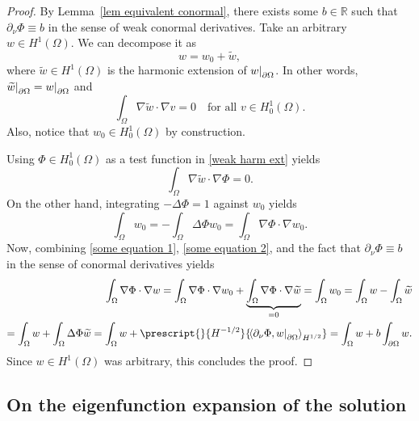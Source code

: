 \documentclass[a4paper,11pt]{article}
\newcommand\restr[2]{{%
\left.\kern-\nulldelimiterspace %
#1 %
\vphantom{|} %
\right|_{#2} %
}}
\newcommand{\Pairing}[2]{
 \prescript{}{{H^{-1/2}}}{\!\left\langle #1, #2\right\rangle_{H^{1/2}}}
 } %
\numberwithin{equation}{section}
\begin{document}
\begin{proof}
By Lemma~\ref{lem equivalent conormal}, there exists some $b\in \mathbb{R}$ such that $\partial_\nu \Phi\equiv b$ in the sense of weak conormal derivatives. Take an arbitrary $w\in H^1(\Omega)$. We can decompose it as
\begin{equation*}
    w=w_0+\widetilde w,
\end{equation*}
where $\widetilde w\in H^1(\Omega)$ is the harmonic extension of $\restr{w}{\partial\Omega}$. In other words, $\restr{\widetilde w}{\partial\Omega}=\restr{w}{\partial\Omega}$ and
\begin{equation}\label{weak harm ext}
   \int_\Omega \nabla \widetilde w \cdot \nabla v =0 \quad \text{for all } v\in H_0^1(\Omega). 
\end{equation}
Also, notice that $w_0\in H_0^1(\Omega)$ by construction.

Using $\Phi\in H_0^1(\Omega)$ as a test function in \eqref{weak harm ext} yields
\begin{equation}\label{some equation 1}
    \int_\Omega \nabla\widetilde w\cdot \nabla \Phi=0.
\end{equation}
On the other hand, integrating $-\Delta\Phi=1$ against $w_0$ yields
\begin{equation}\label{some equation 2}
    \int_\Omega w_0 = -\int_\Omega \Delta \Phi w_0 = \int_\Omega \nabla \Phi\cdot\nabla w_0.
\end{equation} 
Now, combining \eqref{some equation 1}, \eqref{some equation 2}, and the fact that $\partial_\nu \Phi\equiv b$ in the sense of conormal derivatives yields
\begin{equation*}
\begin{aligned}
 \int_\Omega \nabla\Phi\cdot\nabla w = \int_\Omega \nabla\Phi\cdot \nabla w_0 + \underbrace{\int_\Omega\nabla\Phi\cdot \nabla \widetilde w}_{=0} = \int_\Omega w_0 = \int_\Omega w - \int_\Omega \widetilde w \\
 = \int_\Omega w + \int_\Omega \Delta\Phi \widetilde w =
\int_\Omega w + \Pairing{\partial_\nu \Phi}{\restr{w}{\partial\Omega}}=
 \int_\Omega w + b \int_{\partial\Omega}w. 
\end{aligned}
\end{equation*}
Since $w\in H^1(\Omega)$ was arbitrary, this concludes the proof.
\end{proof}

\subsection{On the eigenfunction expansion of the solution}
\end{document}
